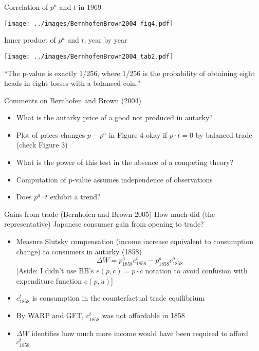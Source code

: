 \documentclass[10pt,notes=hide]{beamer}
\begin{document}
\begin{frame}{Correlation of $p^{a}$ and $t$ in 1969}
\begin{center}\texttt{[image: ../images/BernhofenBrown2004\_fig4.pdf]}\end{center}
\end{frame}
\begin{frame}{Inner product of $p^a$ and $t$, year by year}
\begin{center}\texttt{[image: ../images/BernhofenBrown2004\_tab2.pdf]}\end{center}
{\small ``The p-value is exactly 1/256, where 1/256 is the probability of obtaining eight heads in eight tosses with a balanced coin.''\par}
\end{frame}
\begin{frame}{Comments on Bernhofen and Brown (2004)}
\begin{itemize}
	\item What is the autarky price of a good not produced in autarky?
	\item Plot of prices changes $p-p^{a}$ in Figure 4 okay if $p\cdot t = 0$ by balanced trade (check Figure 3)
	\item What is the power of this test in the absence of a competing theory?
	\item Computation of p-value assumes independence of observations
	\item Does $p^a \cdot t$ exhibit a trend?
\end{itemize}
\end{frame}
\begin{frame}{Gains from trade (Bernhofen and Brown 2005)}
How much did (the representative) Japanese consumer gain from opening to trade?
\begin{itemize}
	\item Measure Slutsky compensation (income increase equivalent to consumption change) to consumers in autarky (1858)
	\begin{equation*}
		\Delta W = p^a_{\text{1858}} c^t_{\text{1858}} - p^a_{\text{1858}} c^a_{\text{1858}}
	\end{equation*}
	[Aside: I didn't use BB's $e(p,c)=p\cdot c$ notation to avoid confusion with expenditure function $e(p,u)$]
	\item $c^t_{\text{1858}}$ is consumption in the counterfactual trade equilibrium
	\item By WARP and GFT, $c^t_{\text{1858}}$ was not affordable in 1858
	\item $\Delta W$ identifies how much more income would have been required to afford $c^t_{\text{1858}}$
\end{itemize}
\end{frame}
\end{document}
